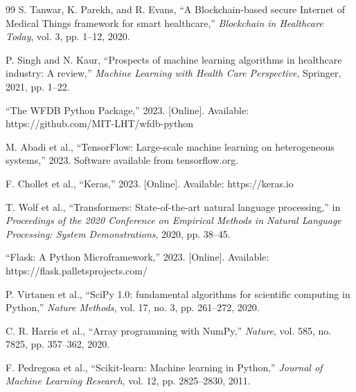 \documentclass[conference]{IEEEtran}
\begin{document}
\begin{thebibliography}{99}
S. Tanwar, K. Parekh, and R. Evans, ``A Blockchain-based secure Internet of Medical Things framework for smart healthcare,'' \textit{Blockchain in Healthcare Today}, vol. 3, pp. 1--12, 2020.

P. Singh and N. Kaur, ``Prospects of machine learning algorithms in healthcare industry: A review,'' \textit{Machine Learning with Health Care Perspective}, Springer, 2021, pp. 1--22.

``The WFDB Python Package,'' 2023. [Online]. Available: https://github.com/MIT-LHT/wfdb-python

M. Abadi et al., ``TensorFlow: Large-scale machine learning on heterogeneous systems,'' 2023. Software available from tensorflow.org.

F. Chollet et al., ``Keras,'' 2023. [Online]. Available: https://keras.io

T. Wolf et al., ``Transformers: State-of-the-art natural language processing,'' in \textit{Proceedings of the 2020 Conference on Empirical Methods in Natural Language Processing: System Demonstrations}, 2020, pp. 38--45.

``Flask: A Python Microframework,'' 2023. [Online]. Available: https://flask.palletsprojects.com/

P. Virtanen et al., ``SciPy 1.0: fundamental algorithms for scientific computing in Python,'' \textit{Nature Methods}, vol. 17, no. 3, pp. 261--272, 2020.

C. R. Harris et al., ``Array programming with NumPy,'' \textit{Nature}, vol. 585, no. 7825, pp. 357--362, 2020.

F. Pedregosa et al., ``Scikit-learn: Machine learning in Python,'' \textit{Journal of Machine Learning Research}, vol. 12, pp. 2825--2830, 2011.
\end{thebibliography}


\balance
\end{document}
